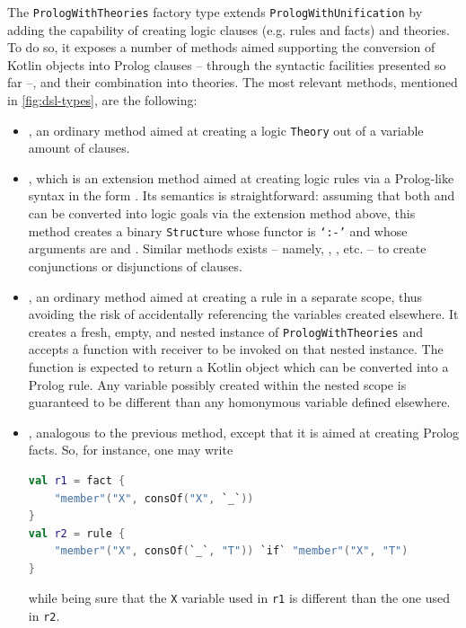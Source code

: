 \documentclass[12pt,a4paper,openright,twoside]{book}
\begin{document}
The \texttt{Pro\-logWi\-thTheo\-ries} factory type extends \texttt{Pro\-logWi\-thU\-ni\-fi\-ca\-tion} by adding the capability of creating logic clauses (e.g. rules and facts) and theories.
%
To do so, it exposes a number of methods aimed supporting the conversion of Kotlin objects into Prolog clauses -- through the syntactic facilities presented so far --, and their combination into theories.
%
The most relevant methods, mentioned in \cref{fig:dsl-types}, are the following:
%
\begin{itemize}
    \item {}, an ordinary method aimed at creating a logic \texttt{Theory} out of a variable amount of clauses.

    \item {}, which is an extension method aimed at creating logic rules via a Prolog-like syntax in the form .
    Its semantics is straightforward: assuming that both  and  can be converted into logic goals via the  extension method above, this method creates a binary \texttt{Struct}ure whose functor is \texttt{`:-'} and whose arguments are  and .
    Similar methods exists -- namely, , , etc. --  to create conjunctions or disjunctions of clauses.
    \item {}, an ordinary method aimed at creating a rule in a separate scope, thus avoiding the risk of accidentally referencing the variables created elsewhere.
    It creates a fresh, empty, and nested instance of \texttt{Pro\-logWi\-thTheo\-ries} and accepts a function with receiver to be invoked on that nested instance.
    The function is expected to return a Kotlin object which can be converted into a Prolog rule.
    Any variable possibly created within the nested scope is guaranteed to be different than any homonymous variable defined elsewhere.
    \item {},  analogous to the previous method, except that it is aimed at creating Prolog facts.
    So, for instance, one may write
\begin{lstlisting}[language=Kotlin]
val r1 = fact {
    "member"("X", consOf("X", `_`))
}
val r2 = rule {
    "member"("X", consOf(`_`, "T")) `if` "member"("X", "T")
}
\end{lstlisting}
    while being sure that the \texttt{X} variable used in \texttt{r1} is different than the one used in \texttt{r2}.
\end{itemize}
\end{document}
